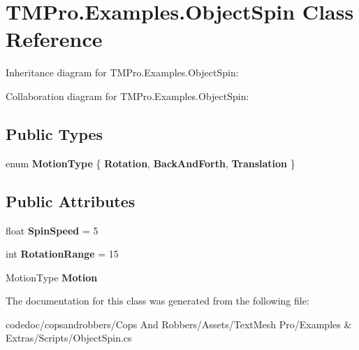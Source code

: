 \hypertarget{classTMPro_1_1Examples_1_1ObjectSpin}{}\section{T\+M\+Pro.\+Examples.\+Object\+Spin Class Reference}
\label{classTMPro_1_1Examples_1_1ObjectSpin}


Inheritance diagram for T\+M\+Pro.\+Examples.\+Object\+Spin\+:


Collaboration diagram for T\+M\+Pro.\+Examples.\+Object\+Spin\+:
\subsection*{Public Types}
\begin{DoxyCompactItemize}
\item 
\mbox{\label{classTMPro_1_1Examples_1_1ObjectSpin_a45f51bc7820e9bbc91c1806bcaded7fc}} 
enum {\bfseries Motion\+Type} \{ {\bfseries Rotation}, 
{\bfseries Back\+And\+Forth}, 
{\bfseries Translation}
 \}
\end{DoxyCompactItemize}
\subsection*{Public Attributes}
\begin{DoxyCompactItemize}
\item 
\mbox{\label{classTMPro_1_1Examples_1_1ObjectSpin_a4b1d0b19553122b485c5878fe45ea0b3}} 
float {\bfseries Spin\+Speed} = 5
\item 
\mbox{\label{classTMPro_1_1Examples_1_1ObjectSpin_a802c4f5441264532dd2b379c48dfa012}} 
int {\bfseries Rotation\+Range} = 15
\item 
\mbox{\label{classTMPro_1_1Examples_1_1ObjectSpin_ae422bdffcabfc75fae2c0bad902124f1}} 
Motion\+Type {\bfseries Motion}
\end{DoxyCompactItemize}


The documentation for this class was generated from the following file\+:\begin{DoxyCompactItemize}
\item 
codedoc/copsandrobbers/\+Cops And Robbers/\+Assets/\+Text\+Mesh Pro/\+Examples \& Extras/\+Scripts/Object\+Spin.\+cs\end{DoxyCompactItemize}
